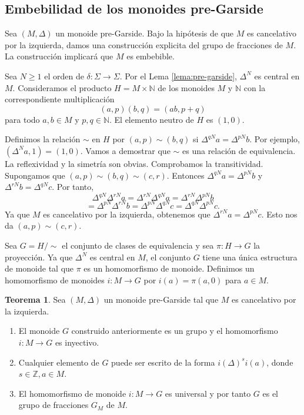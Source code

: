 \documentclass[12pt]{book}
\theoremstyle{definition}
\newtheorem{teor}{Teorema}[section]
\begin{document}
\subsection{Embebilidad de los monoides pre-Garside}

Sea $(M,\Delta)$ un monoide pre-Garside. Bajo la hipótesis de que $M$ es cancelativo por la izquierda, damos una construcción explicita del grupo de fracciones de $M$. La construcción implicará que $M$ es embebible.

Sea $N\geq 1$ el orden de $\delta:\Sigma\rightarrow\Sigma$. Por el Lema \ref{lema:pre-garside}, $\Delta^N$ es central en $M$. Consideramos el producto $H=M\times\mathbb{N}$ de los monoides $M$ y $\mathbb{N}$ con la correspondiente multiplicación
$$(a,p)(b,q)=(ab,p+q)$$
para todo $a,b\in M$ y $p,q\in\mathbb{N}$. El elemento neutro de $H$ es $(1,0)$.

Definimos la relación $\sim$ en $H$ por $(a,p)\sim(b,q)$ si $\Delta^{qN}a=\Delta^{pN}b$. Por ejemplo, $(\Delta^{N}a,1)=(1,0)$. Vamos a demostrar que $\sim$ es una relación de equivalencia. La reflexividad y la simetría son obvias. Comprobamos la transitividad. Supongamos que $(a,p)\sim(b,q)\sim(c,r)$. Entonces $\Delta^{qN}a=\Delta^{pN}b$ y $\Delta^{rN}b=\Delta^{qN}c$. Por tanto,
$$\Delta^{qN}\Delta^{rN}a=\Delta^{rN}\Delta^{qN}a=\Delta^{rN}\Delta^{pN}b$$
$$=\Delta^{pN}\Delta^{rN}b=\Delta^{pN}\Delta^{qN}c=\Delta^{qN}\Delta^{pN}c.$$
Ya que $M$ es cancelativo por la izquierda, obtenemos que $\Delta^{rN}a=\Delta^{pN}c$. Esto nos da $(a,p)\sim(c,r)$.

Sea $G=H/\sim$ el conjunto de clases de equivalencia y sea $\pi:H\rightarrow G$ la proyección. Ya que $\Delta^N$ es central en $M$, el conjunto $G$ tiene una única estructura de monoide tal que $\pi$ es un homomorfismo de monoide. Definimos un homomorfismo de monoides $i:M\rightarrow G$ por $i(a)=\pi(a,0)$ para $a\in M$.

\begin{teor}
Sea $(M,\Delta)$ un monoide pre-Garside tal que $M$ es cancelativo por la izquierda.
\begin{enumerate}[label=(\roman*)]
\item El monoide $G$ construido anteriormente es un grupo y el homomorfismo $i:M\rightarrow G$ es inyectivo.
\item Cualquier elemento de $G$ puede ser escrito de la forma $i(\Delta)^si(a)$, donde $s\in\mathbb{Z}, a\in M$.
\item El homomorfismo de monoide $i:M\rightarrow G$ es universal y por tanto $G$ es el grupo de fracciones $G_M$ de $M$.
\end{enumerate}
\label{teor:pre-garside}
\end{teor}
\end{document}
